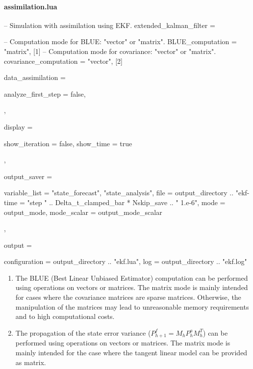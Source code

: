 \documentclass{tufte-book}
\begin{document}
 \paragraph{assimilation.lua}
 \begin{frame_lua}
-- Simulation with assimilation using EKF.
extended_kalman_filter = {

   -- Computation mode for BLUE: "vector" or "matrix".
   BLUE_computation = "matrix", [1]
   -- Computation mode for covariance: "vector" or "matrix".
   covariance_computation = "vector", [2]

   data_assimilation = {

      analyze_first_step = false,

   },

   display = {

      show_iteration = false,
      show_time = true
   },

   output_saver = {

      variable_list = {"state_forecast", "state_analysis"},
      file = output_directory .. "ekf-%
      time = "step " .. Delta_t_clamped_bar * Nskip_save .. " 1.e-6",
      mode = output_mode,
      mode_scalar = output_mode_scalar

   },

   output = {

     configuration = output_directory .. "ekf.lua",
     log = output_directory .. "ekf.log"

  }

}

 \end{frame_lua}

 \begin{enumerate}

\item The BLUE (Best Linear Unbiased Estimator) computation can be performed using operations on vectors or matrices.
 The matrix mode is mainly intended for cases where the covariance matrices
      are sparse matrices. Otherwise, the manipulation of the matrices may
      lead to unreasonable memory requirements and to high computational
      costs.

 \item The propagation of the state error variance ($P_{h+1}^f = M_{h} P_{h}^a M_{h}^T $)  can be performed using operations on vectors or matrices.
 The matrix mode is mainly intended for the case where the tangent linear model can be provided as matrix.
 \end{enumerate}
\end{document}

